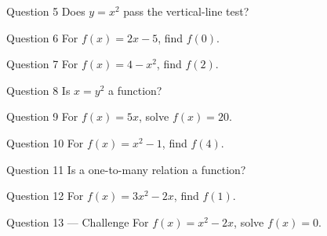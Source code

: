 \documentclass[11pt]{article}
\begin{document}
\begin{qbox}{Question 5}
Does $y=x^2$ pass the vertical-line test?\workspace{2.4cm}
\end{qbox}

\begin{qbox}{Question 6}
For $f(x)=2x-5$, find $f(0)$.\workspace{2.4cm}
\end{qbox}

\begin{qbox}{Question 7}
For $f(x)=4-x^2$, find $f(2)$.\workspace{2.4cm}
\end{qbox}

\begin{qbox}{Question 8}
Is $x=y^2$ a function?\workspace{2.4cm}
\end{qbox}

\begin{qbox}{Question 9}
For $f(x)=5x$, solve $f(x)=20$.\workspace{2.4cm}
\end{qbox}

\begin{qbox}{Question 10}
For $f(x)=x^2-1$, find $f(4)$.\workspace{2.4cm}
\end{qbox}

\begin{qbox}{Question 11}
Is a one-to-many relation a function?\workspace{2.4cm}
\end{qbox}

\begin{qbox}{Question 12}
For $f(x)=3x^2-2x$, find $f(1)$.\workspace{2.4cm}
\end{qbox}

\begin{qbox}{Question 13 --- Challenge}
For $f(x)=x^2-2x$, solve $f(x)=0$.\workspace{2.6cm}
\end{qbox}

\clearpage
{}
\end{document}

